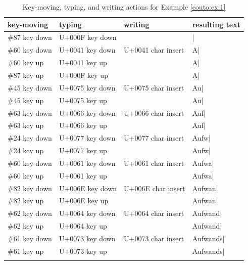 \documentclass[output=paper]{LSP/langsci}
\begin{document}
\begin{table}%
\begin{tabular}{llll}
\lsptoprule
key-moving & typing & writing & resulting text \\
\midrule
\#87 key down & U+000F key down & & | \\
\#60 key down & U+0041 key down & U+0041 char insert & A| \\
\#60 key up & U+0041 key up & & A| \\
\#87 key up & U+000F key up & & A| \\
\hline
\#45 key down & U+0075 key down & U+0075 char insert & Au| \\
\#45 key up & U+0075 key up & & Au| \\
\hline
\#63 key down & U+0066 key down & U+0066 char insert & Auf| \\
\#63 key up & U+0066 key up & & Auf| \\
\hline
\#24 key down & U+0077 key down & U+0077 char insert & Aufw| \\
\#24 key up & U+0077 key up & & Aufw| \\
\hline
\#60 key down & U+0061 key down & U+0061 char insert & Aufwa| \\
\#60 key up & U+0061 key up & & Aufwa| \\
\hline
\#82 key down & U+006E key down & U+006E char insert & Aufwan| \\
\#82 key up & U+006E key up & & Aufwan| \\
\hline
\#62 key down & U+0064 key down & U+0064 char insert & Aufwand| \\
\#62 key up & U+0064 key up & & Aufwand| \\
\hline
\#61 key down & U+0073 key down & U+0073 char insert & Aufwands| \\
\#61 key up & U+0073 key up & & Aufwands| \\
\lspbottomrule
\end{tabular}
\caption{Key-moving, typing, and writing actions for Example \ref{couto:ex:1}}
\label{couto:tab:2}
\end{table}
\end{document}

